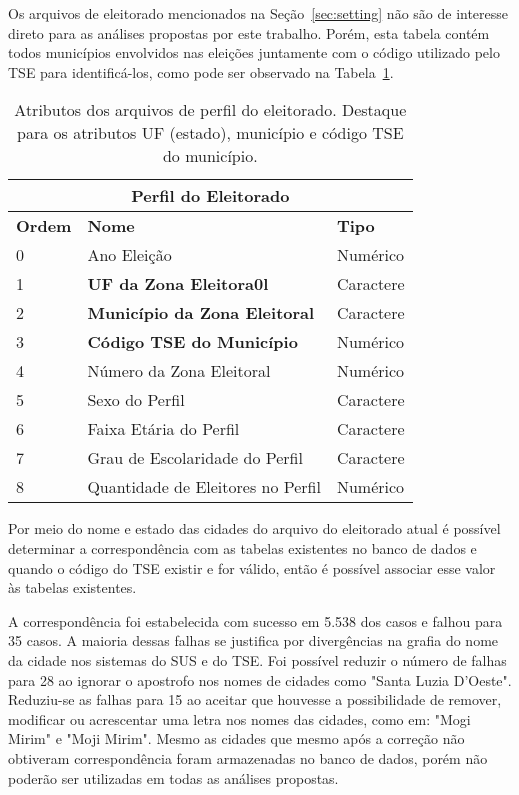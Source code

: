 Os arquivos de eleitorado mencionados na Seção~\ref{sec:setting} não são de interesse  direto para as análises propostas por este trabalho. Porém, esta tabela contém todos   municípios envolvidos nas eleições juntamente com o código utilizado pelo TSE para     identificá-los, como pode ser observado na Tabela~\ref{tab:eleitorado}.

\begin{table}[h!]
        \centering
        \begin{tabular}{|l|l|l|}
                \hline
                \multicolumn{3}{|c|}{\textbf{Perfil do Eleitorado}} \\
                \hline
                \textbf{Ordem} &  \textbf{Nome} & \textbf{Tipo}   \\
                \hline
                0 & Ano Eleição & Numérico \\
                \hline 
                1 & \textbf{UF da Zona Eleitora0l} & Caractere \\
                \hline
                2 & \textbf{Município da Zona Eleitoral} & Caractere \\
                \hline
                3 & \textbf{Código TSE do Município} & Numérico \\ 
                \hline
                4 & Número da Zona Eleitoral  & Numérico \\
                \hline
                5 & Sexo do Perfil & Caractere \\
                \hline
                6 & Faixa Etária do Perfil & Caractere \\
                \hline
                7 & Grau de Escolaridade do Perfil & Caractere \\
                \hline
                8 & Quantidade de Eleitores no Perfil & Numérico \\
                \hline
        \end{tabular}
        \caption{Atributos dos arquivos de perfil do eleitorado. Destaque para os      atributos UF (estado), município e código TSE do município.}
        \label{tab:eleitorado}
\end{table}

Por meio do nome e estado das cidades do arquivo do eleitorado atual é possível        determinar a correspondência com as tabelas existentes no banco de dados e quando o    código do TSE existir e for válido, então é possível associar esse valor às tabelas    existentes.

A correspondência foi estabelecida com sucesso em 5.538 dos casos e falhou para 35     casos. A maioria dessas falhas se justifica por divergências na grafia do nome da      cidade nos sistemas do SUS e do TSE. Foi possível reduzir o número de falhas para 28   ao ignorar o apostrofo nos nomes de cidades como "Santa Luzia D'Oeste". Reduziu-se as  falhas para 15 ao aceitar que houvesse a possibilidade de remover, modificar ou        acrescentar uma letra nos nomes das cidades, como em: "Mogi Mirim" e "Moji Mirim".     Mesmo as cidades que mesmo após a correção não obtiveram correspondência foram         armazenadas no banco de dados, porém não poderão ser utilizadas em todas as análises   propostas.

